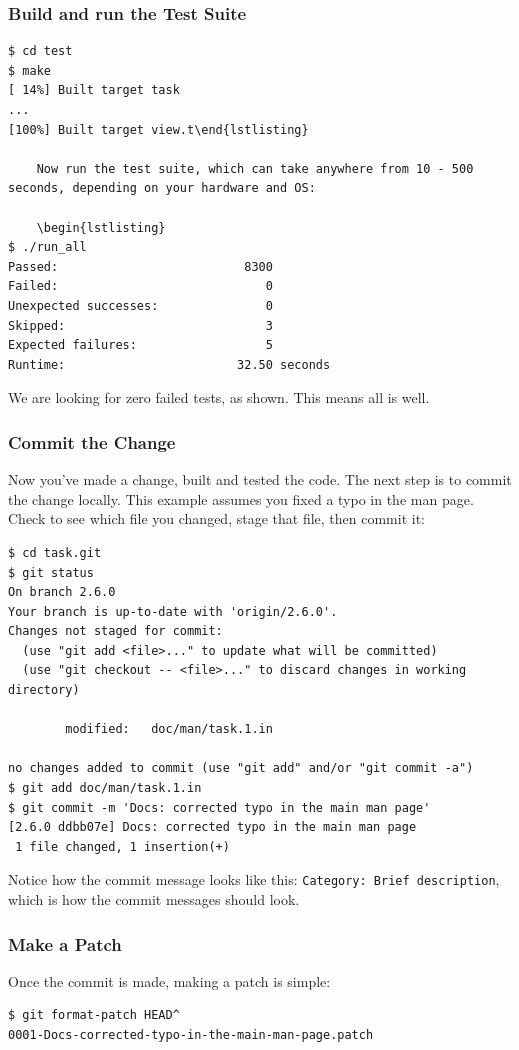 \documentclass[t,handout]{beamer}
\begin{document}
\begin{frame}[fragile]\frametitle{Build and run the Test Suite}
    \begin{lstlisting}
$ cd test
$ make
[ 14%] Built target task
...
[100%] Built target view.t\end{lstlisting}

    Now run the test suite, which can take anywhere from 10 - 500 seconds, depending on your hardware and OS:

    \begin{lstlisting}
$ ./run_all
Passed:                          8300
Failed:                             0
Unexpected successes:               0
Skipped:                            3
Expected failures:                  5
Runtime:                        32.50 seconds\end{lstlisting}

    We are looking for zero failed tests, as shown.  This means all is well.
\end{frame}

\begin{frame}[fragile]\frametitle{Commit the Change}
    Now you've made a change, built and tested the code. The next step is to commit the change locally. This example assumes you fixed a typo in the man page. Check to see which file you changed, stage that file, then commit it:

    \begin{lstlisting}
$ cd task.git
$ git status
On branch 2.6.0
Your branch is up-to-date with 'origin/2.6.0'.
Changes not staged for commit:
  (use "git add <file>..." to update what will be committed)
  (use "git checkout -- <file>..." to discard changes in working directory)

        modified:   doc/man/task.1.in

no changes added to commit (use "git add" and/or "git commit -a")
$ git add doc/man/task.1.in
$ git commit -m 'Docs: corrected typo in the main man page'
[2.6.0 ddbb07e] Docs: corrected typo in the main man page
 1 file changed, 1 insertion(+)\end{lstlisting}

Notice how the commit message looks like this: \verb=Category: Brief description=, which is how the commit messages should look.
\end{frame}

\begin{frame}[fragile]\frametitle{Make a Patch}
    \vfill
    Once the commit is made, making a patch is simple:

    \begin{lstlisting}
$ git format-patch HEAD^
0001-Docs-corrected-typo-in-the-main-man-page.patch\end{lstlisting}
\vfill

\end{frame}
\end{document}
